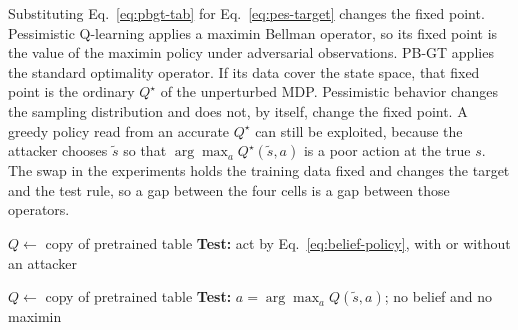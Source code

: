 \documentclass[10pt,twocolumn]{article}
\begin{document}
Substituting Eq.~\eqref{eq:pbgt-tab} for Eq.~\eqref{eq:pes-target} changes the fixed point.
Pessimistic Q-learning applies a maximin Bellman operator, so its fixed point is the value of the maximin policy under adversarial observations.
PB-GT applies the standard optimality operator.
If its data cover the state space, that fixed point is the ordinary $Q^\star$ of the unperturbed MDP.
Pessimistic behavior changes the sampling distribution and does not, by itself, change the fixed point.
A greedy policy read from an accurate $Q^\star$ can still be exploited, because the attacker chooses $\tilde s$ so that $\arg\max_a Q^\star(\tilde s,a)$ is a poor action at the true $s$.
The swap in the experiments holds the training data fixed and changes the target and the test rule, so a gap between the four cells is a gap between those operators.

\begin{algorithm}[t]
\caption{Belief-enriched pessimistic Q (tabular)}
\label{alg:pes-tab}
$Q\leftarrow$ copy of pretrained table\;
\textbf{Test:} act by Eq.~\eqref{eq:belief-policy}, with or without an attacker\;
\end{algorithm}

\begin{algorithm}[t]
\caption{PB-GT Q-learning (tabular)}
\label{alg:pbgt-tab}
$Q\leftarrow$ copy of pretrained table\;
\textbf{Test:} $a=\arg\max_a Q(\tilde s,a)$; no belief and no maximin\;
\end{algorithm}
\end{document}
